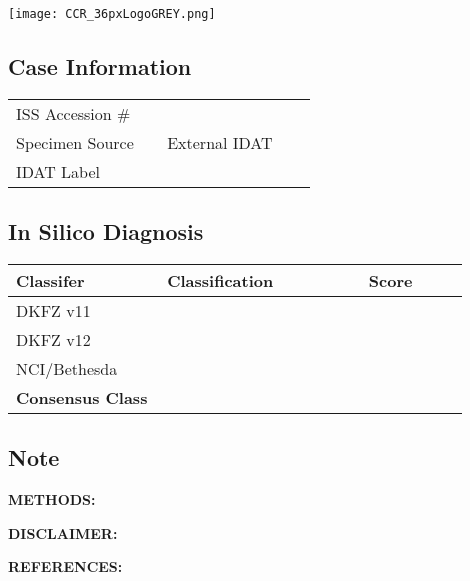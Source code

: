 \documentclass[
	letterpaper, %
	10pt, %
]{CSSullivanBusinessReport}
\begin{document}

\thispagestyle{empty} %

\vspace*{-0.075\textheight} %

\hspace*{-0.55cm}\texttt{[image: CCR\_36pxLogoGREY.png]} %

{\fontsize{18pt}{20pt}\selectfont\raggedright\textbf{\reporttitle}\par} %

{\textit{\textbf{\reportsubtitle}}\par} %

{\reportdate\par} %

\subsection*{Case Information}

\begin{tabular}{@{} L{0.3\linewidth} L{0.3\linewidth} @{}} %
	\toprule
	ISS Accession \# & \\
	Specimen Source & External IDAT\\
	IDAT Label & \\
	\bottomrule
\end{tabular}

\subsection*{In Silico Diagnosis}
\begin{tabular}{@{} L{0.3\linewidth} L{0.4\linewidth} L{0.2\linewidth} @{}} %
    \textbf{Classifer} & \textbf{Classification} & \textbf{Score}\\
	\toprule
	DKFZ v11 &  & \\
	DKFZ v12 &  & \\
	NCI/Bethesda &  & \\
	\textbf{Consensus Class} & \textbf{}\\
	\bottomrule
\end{tabular}

\par
\subsection*{Note}


{\footnotesize
\textbf{METHODS:} 

\textbf{DISCLAIMER:} 

\textbf{REFERENCES:}\\ 
}
\end{document}
